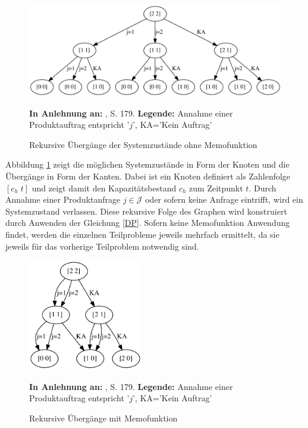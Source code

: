 \begin{figure}[h!]
  \begin{center}
    \includegraphics[width=140mm]{Bilder/Einfach.pdf}
    \caption{Rekursive Übergänge der Systemzustände ohne Memofunktion}  \label{Einfach}
        {\footnotesize \textbf{In Anlehnung an:} \cite{hetland2010python}, S. 179.} 
    {\footnotesize \textbf{Legende:} Annahme einer Produktauftrag entspricht '$j$', KA='Kein Auftrag'} 
  \end{center}
\end{figure}

Abbildung \ref{Einfach} zeigt die möglichen Systemzustände in Form der Knoten und die Übergänge in Form der Kanten. Dabei ist ein Knoten definiert als Zahlenfolge $[c_h\; t]$ und zeigt damit den Kapazitätsbestand $c_h$ zum Zeitpunkt $t$. Durch Annahme einer Produktanfrage $j\in\mathcal{J}$ oder sofern keine Anfrage eintrifft, wird ein Systemzustand verlassen. Diese rekursive Folge des Graphen wird konstruiert durch Anwenden der Gleichung \eqref{DP}. Sofern keine Memofunktion Anwendung findet, werden die einzelnen Teilprobleme jeweils mehrfach ermittelt, da sie jeweils für das vorherige Teilproblem notwendig sind.

\begin{figure}[h!]
  \begin{center}
    \includegraphics[width=50mm]{Bilder/Einfach2.pdf}
    \caption{Rekursive Übergänge mit Memofunktion}  \label{Einfach2}
        {\footnotesize \textbf{In Anlehnung an:} \cite{hetland2010python}, S. 179.} 
    {\footnotesize \textbf{Legende:} Annahme einer Produktauftrag entspricht '$j$', KA='Kein Auftrag'} 
  \end{center}
\end{figure}

